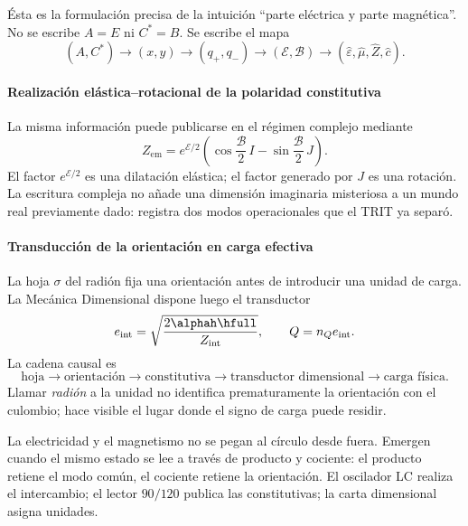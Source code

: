 Ésta es la formulación precisa de la intuición \enquote{parte eléctrica y
parte magnética}. No se escribe \(A=E\) ni \(C^*=B\). Se escribe el mapa
\[
(A,C^*)\to(x,y)\to(q_+,q_-)
\to(\mathcal E,\mathcal B)
\to(\widehat\varepsilon,\widehat\mu,\widehat Z,\widehat c).
\]

\paragraph{Realización elástica--rotacional de la polaridad constitutiva}

La misma información puede publicarse en el régimen complejo mediante
\begin{equation}
Z_{\mathrm{em}}=e^{\mathcal E/2}
\left(\cos\frac{\mathcal B}{2}\,I
-\sin\frac{\mathcal B}{2}\,J\right).
\label{eq:Zem}
\end{equation}
El factor \(e^{\mathcal E/2}\) es una dilatación elástica; el factor generado
por \(J\) es una rotación. La escritura compleja no añade una dimensión
imaginaria misteriosa a un mundo real previamente dado: registra dos modos
operacionales que el TRIT ya separó.

\paragraph{Transducción de la orientación en carga efectiva}

La hoja \(\sigma\) del radión fija una orientación antes de introducir una
unidad de carga. La Mecánica Dimensional dispone luego el transductor
\[
e_{\mathrm{int}}=\sqrt{\frac{2\alphah\hfull}{Z_{\mathrm{int}}}},
\qquad
Q=n_Qe_{\mathrm{int}}.
\]
La cadena causal es
\[
\text{hoja}\to\text{orientación}\to\text{constitutiva}
\to\text{transductor dimensional}\to\text{carga física}.
\]
Llamar \emph{radión} a la unidad no identifica prematuramente la orientación
con el culombio; hace visible el lugar donde el signo de carga puede residir.

\begin{narrativebox}
La electricidad y el magnetismo no se pegan al círculo desde fuera. Emergen
cuando el mismo estado se lee a través de producto y cociente: el producto
retiene el modo común, el cociente retiene la orientación. El oscilador LC
realiza el intercambio; el lector \(90/120\) publica las constitutivas; la
carta dimensional asigna unidades.
\end{narrativebox}
